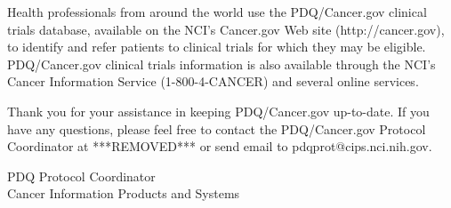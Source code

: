 \documentclass[letterpaper,12pt]{letter}
\begin{document}
Health professionals from around the world use the PDQ/Cancer.gov clinical
trials database, available on the NCI's Cancer.gov Web site
(http://cancer.gov), to identify and refer patients to clinical trials for
which they may be eligible.  PDQ/Cancer.gov clinical trials information is
also available through the NCI's Cancer Information Service (1-800-4-CANCER)
and several online services.

Thank you for your assistance in keeping PDQ/Cancer.gov up-to-date.  If you
have any questions, please feel free to contact the PDQ/Cancer.gov Protocol
Coordinator at ***REMOVED*** or send email to pdqprot@cips.nci.nih.gov.

\vspace{12pt}

PDQ Protocol Coordinator \\
Cancer Information Products and Systems

\vfill
\end{document}

